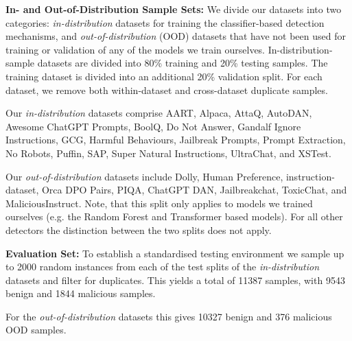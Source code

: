 \label{sec:data_splits}
\textbf{In- and Out-of-Distribution Sample Sets:} We divide our datasets into two categories: {\em in-distribution} datasets for training the classifier-based detection mechanisms, and {\em out-of-distribution} (OOD) datasets that have not been used for training or validation of any of the models we train ourselves. In-distribution-sample datasets are divided into 80\% training and 20\% testing samples. The training dataset is divided into an additional 20\% validation split. For each dataset, we remove both within-dataset and cross-dataset duplicate samples.
 
Our \emph{in-distribution} datasets comprise AART, Alpaca, AttaQ, AutoDAN, Awesome ChatGPT Prompts, BoolQ, Do Not Answer, Gandalf Ignore Instructions, GCG, Harmful Behaviours, Jailbreak Prompts, Prompt Extraction, No Robots, Puffin, SAP, Super Natural Instructions, UltraChat, and XSTest. 

Our \emph{out-of-distribution} datasets include Dolly, Human Preference, instruction-dataset, Orca DPO Pairs, PIQA, ChatGPT DAN, Jailbreakchat, ToxicChat, and MaliciousInstruct. Note, that this split only applies to models we trained ourselves (e.g. the Random Forest and Transformer based models). For all other detectors the distinction between the two splits does not apply.

\textbf{Evaluation Set:}
To establish a standardised testing environment we sample up to 2000 random instances from each of the test splits of the \emph{in-distribution} datasets and filter for duplicates. This yields a total of 11387 samples, with 9543 benign and 1844 malicious samples.

For the \emph{out-of-distribution} datasets this gives 10327 benign and 376 malicious OOD samples.